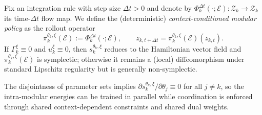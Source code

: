 Fix an integration rule with step size $\Delta t>0$ and denote by $\Phi_{k}^{\Delta t}(\cdot;\mathcal E):\mathcal Z_k\to\mathcal Z_k$
its time-$\Delta t$ flow map.
We define the (deterministic) \emph{context-conditioned modular policy} as the rollout operator
\begin{equation}
\label{eq:module_policy_operator}
 \pi_k^{\theta_k,\xi}(\mathcal E):=\Phi_{k}^{\Delta t}(\cdot;\mathcal E),\qquad z_{k,t+\Delta t}=\pi_k^{\theta_k,\xi}(\mathcal E)(z_{k,t}).
\end{equation}
If $\Gamma_k^{\xi}\equiv 0$ and $u_k^{\xi}\equiv 0$, then $s_k^{\theta_k,\xi}$ reduces to the Hamiltonian vector field and
$\pi_k^{\theta_k,\xi}(\mathcal E)$ is symplectic; otherwise it remains a (local) diffeomorphism under standard Lipschitz
regularity but is generally non-symplectic.

The disjointness of parameter sets implies $\partial s_k^{\theta_k,\xi}/\partial\theta_j\equiv 0$ for all $j\neq k$,
so the intra-modular energies can be trained in parallel while coordination is enforced through shared context-dependent
constraints and shared dual weights.

